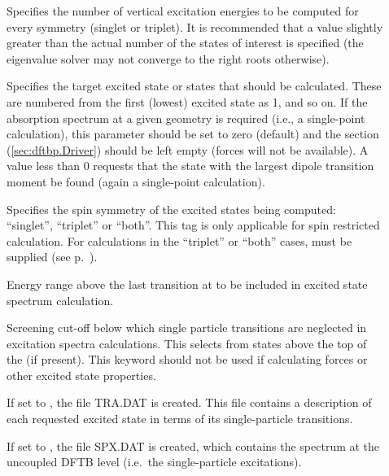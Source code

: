   \begin{description}

  \item[] Specifies the number of vertical excitation energies to be computed
    for every symmetry (singlet or triplet). It is recommended that a value slightly greater than
    the actual number of the states of interest is specified (the eigenvalue solver may not converge
    to the right roots otherwise).

  \item[] Specifies the target excited state or states that should be
    calculated. These are numbered from the first (lowest) excited state as 1, and so on. If the
    absorption spectrum at a given geometry is required (i.e., a single-point calculation), this
    parameter should be set to zero (default) and the  section (\ref{sec:dftbp.Driver})
    should be left empty (forces will not be available). A value less than 0 requests that the
    state with the largest dipole transition moment be found (again a single-point calculation).

  \item[] Specifies the spin symmetry of the excited states being computed:
    ``singlet'', ``triplet'' or ``both''. This tag is only applicable for spin restricted
    calculation. For calculations in the ``triplet'' or ``both'' cases,  must be
    supplied (see p.~).

  \item[] Energy range above the last transition at
     to be included in excited state spectrum calculation.

  \item[] Screening cut-off below which single
    particle transitions are neglected in excitation spectra calculations. This selects from states
    above the top of the  (if present). This keyword should not be used if
    calculating forces or other excited state properties.

  \item[] If set to , the file TRA.DAT is created. This file contains a
    description of each requested excited state in terms of its single-particle transitions.

  \item[] If set to , the file SPX.DAT is created, which contains the
    spectrum at the uncoupled DFTB level (i.e.\ the single-particle excitations).


\end{description}
